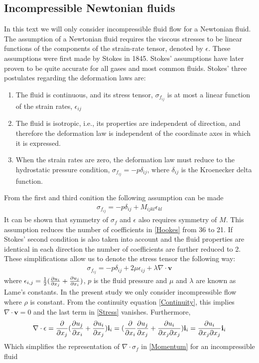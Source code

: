 \subsection{Incompressible Newtonian fluids}
In this text we will only consider incompressible fluid flow for a Newtonian fluid. 
The assumption of a Newtonian fluid requires the viscous stresses to be linear functions of the components of the strain-rate tensor, denoted by $\epsilon$. These assumptions were first made by Stokes in 1845. Stokes' assumptions have later proven to be quite accurate for all gases and most common fluids. Stokes' three postulates regarding the deformation laws are: \cite{Whit06}
\begin{enumerate}
\item The fluid is continuous, and its stress tensor, $\sigma_{f_{ij}}$ is at most a linear function of the strain rates, $\epsilon_{ij}$ 
\item The fluid is isotropic, i.e., its properties are independent of direction, and therefore the deformation law is independent of the coordinate axes in which it is expressed. 
\item When the strain rates are zero, the deformation law must reduce to the hydrostatic pressure condition, $\sigma_{f_{ij}} = -p\delta_{ij}$, where $\delta_{ij}$ is the Kroenecker delta function. 
\end{enumerate}


From the first and third conition the following assumption can be made
\begin{align}
\sigma_{f_{ij}} = -p\delta_{ij} + M_{ijkl}\epsilon_{kl} \label{Hookes}
\end{align}
It can be shown that symmetry of $\sigma_f$ and $\epsilon$ also requires symmetry of $M$. This assumption reduces the number of coefficients in \eqref{Hookes} from 36 to 21. If Stokes' second condition is also taken into account and the fluid properties are identical in each direction the number of coefficients are further reduced to 2. These simplifications allow us to denote the stress tensor the following way:
\begin{align}
\sigma_{f_{ij}} = -p\delta_{ij} + 2\mu\epsilon_{ij} + \lambda \nabla \cdot \mathbf{v} \label{Stress}
\end{align}
where $\epsilon_{i,j} = \frac{1}{2}(\frac{\partial u_i}{\partial x_j} + \frac{\partial u_j}{\partial x_i})$, $p$ is the fluid pressure and $\mu$ and $\lambda$ are known as Lame's constants. In the present study we only consider incompressible flow where $\rho$ is constant. From the continuity equation \eqref{Continuity}, this implies $\nabla \cdot \mathbf{v} = 0$ and the last term in \eqref{Stress} vanishes. Furthermore, 
\begin{align*}
\nabla \cdot \epsilon = \frac{\partial }{\partial x_j}(\frac{\partial u_j}{\partial x_i} + \frac{\partial u_i}{\partial x_j})\mathbf{i}_i = (\frac{\partial }{\partial x_i}\frac{\partial u_j}{\partial x_j} + \frac{\partial u_i}{\partial x_j \partial x_j})\mathbf{i}_i = \frac{\partial u_i}{\partial x_j \partial x_j} \mathbf{i}_i
\end{align*}
Which simplifies the representation of $\nabla \cdot \sigma_f$ in \eqref{Momentum} for an incompressible fluid

